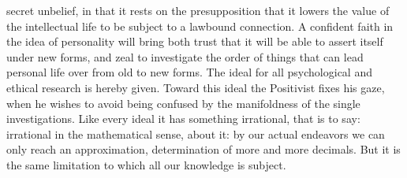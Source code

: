\documentclass[12pt,a4paper,openany]{book}
\newcommand{\opage}[1]{\marginnote{\footnotesize\textit{[#1]}}}
\begin{document}
secret unbelief, in that it rests on the presupposition
that it lowers the value of the intellectual life to be subject to a
lawbound connection. A confident faith in
the idea of personality will bring both trust that it will be able to
assert itself under new forms, and zeal to investigate the
order of things that can lead personal life over from
\opage{241}old to new forms. The ideal for all psychological and ethical
research is hereby given. Toward this ideal the
Positivist fixes his gaze, when he wishes to avoid being confused by the
manifoldness of the single investigations. Like every ideal it has
something irrational, that is to say: irrational in the mathematical sense,
about it: by our actual endeavors we can only
reach an approximation, determination of more and more decimals.
But it is the same limitation to which all our knowledge
is subject.
\end{document}
